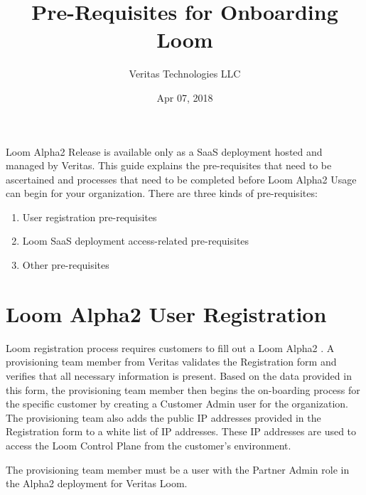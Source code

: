 \documentclass[letterpaper,10pt,english]{sphinxmanual}
\title{Pre-Requisites for Onboarding Loom}
\date{Apr 07, 2018}
\author{Veritas Technologies LLC}
\begin{document}
\maketitle
\sphinxtableofcontents
{}\label{\detokenize{loom_dep_pre_rq::doc}}


Loom Alpha2 Release is available only as a SaaS deployment hosted and managed by Veritas. This guide explains the pre-requisites that need to be ascertained and processes that need to be completed before Loom Alpha2 Usage can begin for your organization. There are three kinds of pre-requisites:
\begin{enumerate}
\item {} 
User registration pre-requisites

\item {} 
Loom SaaS deployment access-related pre-requisites

\item {} 
Other pre-requisites

\end{enumerate}


\chapter{Loom Alpha2 User Registration}
\label{\detokenize{loom_dep_pre_rq:content-loom-dep-pre-req}}\label{\detokenize{loom_dep_pre_rq:loom-early-beta-user-reg}}\label{\detokenize{loom_dep_pre_rq:loom-alpha2-user-registration}}\label{\detokenize{loom_dep_pre_rq:loom-alpha2-release-usage-pre-requisites}}
Loom registration process requires customers to fill out a Loom Alpha2 . A provisioning team member from Veritas validates the Registration form and verifies that all necessary information is present.
Based on the data provided in this form, the provisioning team member then begins the on-boarding process for the specific customer by creating a Customer Admin user for the organization. The provisioning team also adds the public IP addresses provided in the Registration form to a white list of IP addresses. These IP addresses are used to access the Loom Control Plane from the customer’s environment.

The provisioning team member must be a user with the Partner Admin role in the Alpha2 deployment for Veritas Loom.
\end{document}
